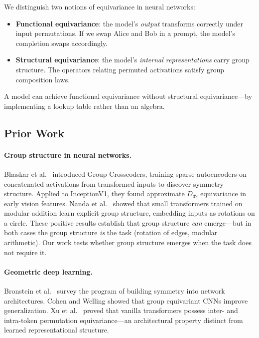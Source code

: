 \documentclass[10pt, letterpaper]{article}
\begin{document}
We distinguish two notions of equivariance in neural networks:
\begin{itemize}[itemsep=2pt]
    \item \textbf{Functional equivariance}: the model's \emph{output} transforms correctly under input permutations. If we swap Alice and Bob in a prompt, the model's completion swaps accordingly.
    \item \textbf{Structural equivariance}: the model's \emph{internal representations} carry group structure. The operators relating permuted activations satisfy group composition laws.
\end{itemize}
A model can achieve functional equivariance without structural equivariance---by implementing a lookup table rather than an algebra.

\subsection{Prior Work}

\paragraph{Group structure in neural networks.} Bhaskar et al.\ \cite{bhaskar2024group} introduced Group Crosscoders, training sparse autoencoders on concatenated activations from transformed inputs to discover symmetry structure. Applied to InceptionV1, they found approximate $D_{32}$ equivariance in early vision features. Nanda et al.\ \cite{nanda2023grokking} showed that small transformers trained on modular addition learn explicit group structure, embedding inputs as rotations on a circle. These positive results establish that group structure \emph{can} emerge---but in both cases the group structure \emph{is} the task (rotation of edges, modular arithmetic). Our work tests whether group structure emerges when the task does not require it.

\paragraph{Geometric deep learning.} Bronstein et al.\ \cite{bronstein2021geometric} survey the program of building symmetry into network architectures. Cohen and Welling \cite{cohen2016group} showed that group equivariant CNNs improve generalization. Xu et al.\ \cite{xu2024permutation} proved that vanilla transformers possess inter- and intra-token permutation equivariance---an architectural property distinct from learned representational structure.
\end{document}
